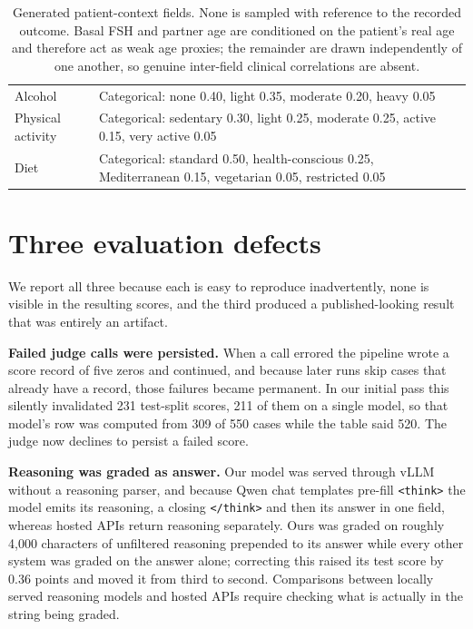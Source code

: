 \documentclass[11pt]{article}
\begin{document}
\begin{table}[H]
\begin{tabular}{p{3.1cm}p{7.4cm}p{2.6cm}}
Alcohol & Categorical: none 0.40, light 0.35, moderate 0.20, heavy 0.05 & \citet{dodge2015} \\
Physical activity & Categorical: sedentary 0.30, light 0.25, moderate 0.25, active 0.15, very active 0.05 & \citet{sherwin2022} \\
Diet & Categorical: standard 0.50, health-conscious 0.25, Mediterranean 0.15, vegetarian 0.05, restricted 0.05 & \citet{gaskins2019} \\
\bottomrule
\end{tabular}
\caption{Generated patient-context fields. None is sampled with reference to the recorded outcome. Basal FSH and partner age are conditioned on the patient's real age and therefore act as weak age proxies; the remainder are drawn independently of one another, so genuine inter-field clinical correlations are absent.}
\end{table}


\section{Three evaluation defects}
\label{app:defects}
We report all three because each is easy to reproduce inadvertently, none is
visible in the resulting scores, and the third produced a published-looking
result that was entirely an artifact.

\textbf{Failed judge calls were persisted.} When a call errored the pipeline
wrote a score record of five zeros and continued, and because later runs skip
cases that already have a record, those failures became permanent. In our initial
pass this silently invalidated 231 test-split scores, 211 of them on a single
model, so that model's row was computed from 309 of 550 cases while the table
said 520. The judge now declines to persist a failed score.

\textbf{Reasoning was graded as answer.} Our model was served through vLLM
without a reasoning parser, and because Qwen chat templates pre-fill
\texttt{<think>} the model emits its reasoning, a closing \texttt{</think>} and
then its answer in one field, whereas hosted APIs return reasoning separately.
Ours was graded on roughly 4,000 characters of unfiltered reasoning prepended to
its answer while every other system was graded on the answer alone; correcting
this raised its test score by 0.36 points and moved it from third to second.
Comparisons between locally served reasoning models and hosted APIs require
checking what is actually in the string being graded.
\end{document}
